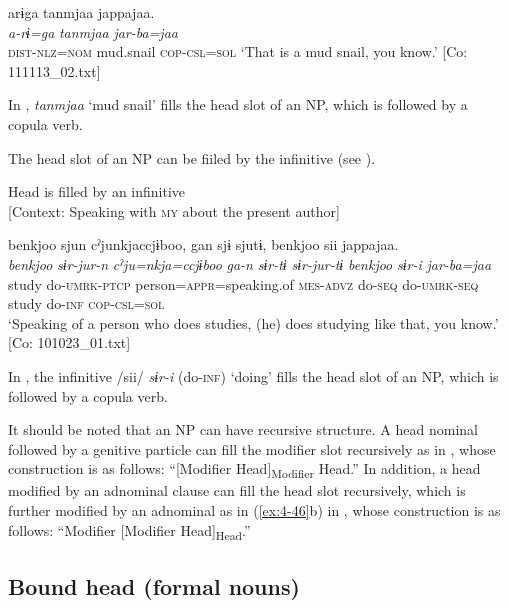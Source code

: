 {\TM}
\glll arɨga  tanmjaa  jappajaa.\\
\textit{a-rɨ=ga}  \textit{tanmjaa}  \textit{jar-ba=jaa}\\
    \textsc{dist}-\textsc{nlz}=\textsc{nom}  mud.snail  \textsc{cop}-\textsc{csl}=\textsc{sol}
\glt    ‘That is a mud snail, you know.’ [Co: 111113\_02.txt]
\z

In , \textit{tanmjaa} ‘mud snail’ fills the head slot of an NP, which is followed by a copula verb.

The head slot of an NP can be fiiled by the infinitive (see ).

\ea\label{ex:6-9}
 Head is filled by an infinitive\\{}
[Context: Speaking with \textsc{my} about the present author]

{\TM}
\glll {\textbar}benkjoo{\textbar}  sjun  cˀjunkjaccjɨboo,  gan  sjɨ    sjutɨ,  {\textbar}benkjoo{\textbar}  sii  jappajaa.\\
\textit{benkjoo}  \textit{sɨr-jur-n}  \textit{cˀju=nkja=ccjɨboo}  \textit{ga-n}  \textit{sɨr-tɨ}    \textit{sɨr-jur-tɨ}  \textit{benkjoo}  \textit{sɨr-i}  \textit{jar-ba=jaa}\\
study  do-\textsc{umrk}-\textsc{ptcp}  person=\textsc{appr}=speaking.of  \textsc{mes}-\textsc{advz}  do-\textsc{seq}    do-\textsc{umrk}-\textsc{seq}  study  do-\textsc{inf}  \textsc{cop}-\textsc{csl}=\textsc{sol}\\
\glt    ‘Speaking of a person who does studies, (he) does studying like that, you know.’ [Co: 101023\_01.txt]
\z

In , the infinitive /sii/ \textit{sɨr-i} (do-\textsc{inf}) ‘doing’ fills the head slot of an NP, which is followed by a copula verb.

It should be noted that an NP can have recursive structure. A head nominal followed by a genitive particle can fill the modifier slot recursively as in , whose construction is as follows: “[Modifier Head]\textsubscript{Modifier} Head.” In addition, a head modified by an adnominal clause can fill the head slot recursively, which is further modified by an adnominal as in (\ref{ex:4-46}b) in , whose construction is as follows: “Modifier [Modifier Head]\textsubscript{Head}.”

\subsection{Bound head (formal nouns)}

